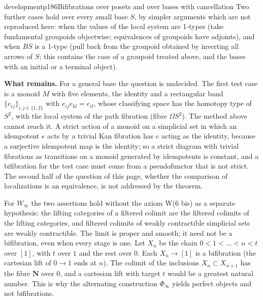 \begin{dcomment}{development}{p186}{Bifibrations over posets and over bases with cancellation}
Two further cases hold over every small base $S$, by simpler arguments which are not reproduced here: when the values of the local system are 1-types (take fundamental groupoids objectwise; equivalences of groupoids have adjoints), and when $BS$ is a 1-type (pull back from the groupoid obtained by inverting all arrows of $S$; this contains the case of a groupoid treated above, and the bases with an initial or a terminal object).

\textbf{What remains.}
For a general base the question is undecided. The first test case is a monoid $M$ with five elements, the identity and a rectangular band $\{e_{ij}\}_{i,j\in\{1,2\}}$ with $e_{ij}e_{kl}=e_{il}$, whose classifying space has the homotopy type of $S^2$, with the local system of the path fibration (fibre $\Omega S^2$). The method above cannot reach it. A strict action of a monoid on a simplicial set in which an idempotent $e$ acts by a trivial Kan fibration has $e$ acting as the identity, because a surjective idempotent map is the identity; so a strict diagram with trivial fibrations as transitions on a monoid generated by idempotents is constant, and a bifibration for the test case must come from a pseudofunctor that is not strict. The second half of the question of this page, whether the comparison of localizations is an equivalence, is not addressed by the theorem.
\end{dcomment}

For $W_\infty$ the two assertions hold without the axiom W(6 bis) as a separate hypothesis: the lifting categories of a filtered colimit are the filtered colimits of the lifting categories, and filtered colimits of weakly contractible simplicial sets are weakly contractible. The limit is proper and smooth; it need not be a bifibration, even when every stage is one. Let $X_n$ be the chain $0<1<\dots<n<t$ over $[1]$, with $t$ over $1$ and the rest over $0$. Each $X_n\to[1]$ is a bifibration (the cartesian lift of $0\to1$ ends at $n$). The colimit of the inclusions $X_n\subset X_{n+1}$ has the fibre $\mathbf N$ over $0$, and a cartesian lift with target $t$ would be a greatest natural number. This is why the alternating construction $\Phi_\infty$ yields perfect objects and not bifibrations.
